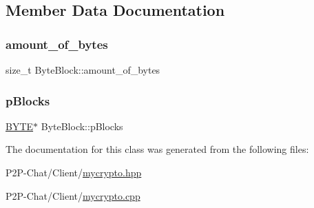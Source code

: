 \subsection{Member Data Documentation}
\mbox{\label{class_byte_block_a96ef9896e7d4a252485bbac909c7cb76}} 
\subsubsection{\texorpdfstring{amount\+\_\+of\+\_\+bytes}{amount\_of\_bytes}}
{\footnotesize\ttfamily size\+\_\+t Byte\+Block\+::amount\+\_\+of\+\_\+bytes\hspace{0.3cm}{\ttfamily [private]}}

\mbox{\label{class_byte_block_a9cc668dbb2b3562e1b72b2265f3bc077}} 
\subsubsection{\texorpdfstring{p\+Blocks}{pBlocks}}
{\footnotesize\ttfamily \hyperlink{mycrypto_8hpp_a4ae1dab0fb4b072a66584546209e7d58}{B\+Y\+TE}$\ast$ Byte\+Block\+::p\+Blocks\hspace{0.3cm}{\ttfamily [private]}}



The documentation for this class was generated from the following files\+:\begin{DoxyCompactItemize}
\item 
P2\+P-\/\+Chat/\+Client/\hyperlink{mycrypto_8hpp}{mycrypto.\+hpp}\item 
P2\+P-\/\+Chat/\+Client/\hyperlink{mycrypto_8cpp}{mycrypto.\+cpp}\end{DoxyCompactItemize}
